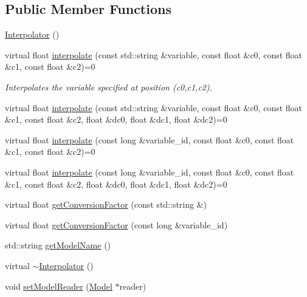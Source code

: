\subsection*{Public Member Functions}
\begin{DoxyCompactItemize}
\item 
\hyperlink{classccmc_1_1_interpolator_aad045da9084b7ecb248f336502c643e5}{Interpolator} ()
\item 
virtual float \hyperlink{classccmc_1_1_interpolator_ad5c1dd3693f83d75a2335b7c28cd649d}{interpolate} (const std\-::string \&variable, const float \&c0, const float \&c1, const float \&c2)=0
\begin{DoxyCompactList}\small\item\em Interpolates the variable specified at position (c0,c1,c2). \end{DoxyCompactList}\item 
virtual float \hyperlink{classccmc_1_1_interpolator_ae02453da5a1a8f472f33b2058424ddb6}{interpolate} (const std\-::string \&variable, const float \&c0, const float \&c1, const float \&c2, float \&dc0, float \&dc1, float \&dc2)=0
\item 
virtual float \hyperlink{classccmc_1_1_interpolator_a6bfe1b4075f03704b893bb96e1675a3b}{interpolate} (const long \&variable\-\_\-id, const float \&c0, const float \&c1, const float \&c2)=0
\item 
virtual float \hyperlink{classccmc_1_1_interpolator_aa6b272bd53630020d92938ec1e5cfad9}{interpolate} (const long \&variable\-\_\-id, const float \&c0, const float \&c1, const float \&c2, float \&dc0, float \&dc1, float \&dc2)=0
\item 
virtual float \hyperlink{classccmc_1_1_interpolator_aa34cdc52236e6f143032340907dfa403}{get\-Conversion\-Factor} (const std\-::string \&)
\item 
virtual float \hyperlink{classccmc_1_1_interpolator_ab5d482c6e07c9fe00d01061b414ebd66}{get\-Conversion\-Factor} (const long \&variable\-\_\-id)
\item 
std\-::string \hyperlink{classccmc_1_1_interpolator_ad35acb724fffeea5794a0c6e2a10f7a9}{get\-Model\-Name} ()
\item 
virtual \hyperlink{classccmc_1_1_interpolator_a6f36d0af2bd233263435f5864713be4c}{$\sim$\-Interpolator} ()
\item 
void \hyperlink{classccmc_1_1_interpolator_a8fb97723e88936e5878e64ac97f6b193}{set\-Model\-Reader} (\hyperlink{classccmc_1_1_model}{Model} $\ast$reader)
\end{DoxyCompactItemize}
